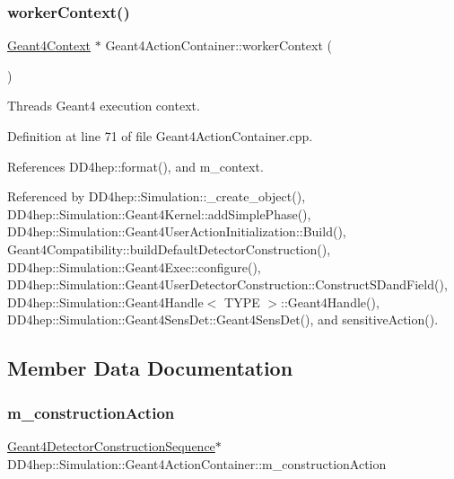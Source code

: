 \subsubsection{\texorpdfstring{worker\+Context()}{workerContext()}}
{\footnotesize\ttfamily \hyperlink{class_d_d4hep_1_1_simulation_1_1_geant4_context}{Geant4\+Context} $\ast$ Geant4\+Action\+Container\+::worker\+Context (\begin{DoxyParamCaption}{ }\end{DoxyParamCaption})}



Thread\textquotesingle{}s Geant4 execution context. 



Definition at line 71 of file Geant4\+Action\+Container.\+cpp.



References D\+D4hep\+::format(), and m\+\_\+context.



Referenced by D\+D4hep\+::\+Simulation\+::\+\_\+create\+\_\+object(), D\+D4hep\+::\+Simulation\+::\+Geant4\+Kernel\+::add\+Simple\+Phase(), D\+D4hep\+::\+Simulation\+::\+Geant4\+User\+Action\+Initialization\+::\+Build(), Geant4\+Compatibility\+::build\+Default\+Detector\+Construction(), D\+D4hep\+::\+Simulation\+::\+Geant4\+Exec\+::configure(), D\+D4hep\+::\+Simulation\+::\+Geant4\+User\+Detector\+Construction\+::\+Construct\+S\+Dand\+Field(), D\+D4hep\+::\+Simulation\+::\+Geant4\+Handle$<$ T\+Y\+P\+E $>$\+::\+Geant4\+Handle(), D\+D4hep\+::\+Simulation\+::\+Geant4\+Sens\+Det\+::\+Geant4\+Sens\+Det(), and sensitive\+Action().



\subsection{Member Data Documentation}
\hypertarget{class_d_d4hep_1_1_simulation_1_1_geant4_action_container_a98e2929884380e696c80a9c50c072afe}{}\label{class_d_d4hep_1_1_simulation_1_1_geant4_action_container_a98e2929884380e696c80a9c50c072afe} 
\subsubsection{\texorpdfstring{m\+\_\+construction\+Action}{m\_constructionAction}}
{\footnotesize\ttfamily \hyperlink{class_d_d4hep_1_1_simulation_1_1_geant4_detector_construction_sequence}{Geant4\+Detector\+Construction\+Sequence}$\ast$ D\+D4hep\+::\+Simulation\+::\+Geant4\+Action\+Container\+::m\+\_\+construction\+Action\hspace{0.3cm}{\ttfamily [protected]}}



